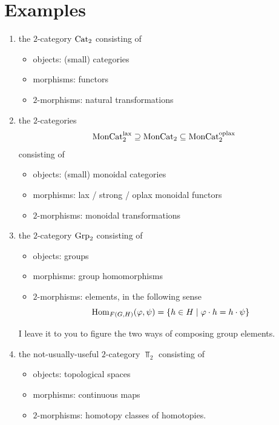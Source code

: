     \section{Examples}
        \begin{enumerate}[label=\roman*)]
            \item
                the $2$-category $\operatorname{Cat}_2$ consisting of
                \begin{itemize}
                    \item[] objects: (small) categories
                    \item[] morphisms: functors
                    \item[] $2$-morphisms: natural transformations
                \end{itemize}
            \item 
                the $2$-categories
                \begin{equation*}
                    \operatorname{MonCat}_2^{\operatorname{lax}} \supseteq \operatorname{MonCat}_2 \subseteq \operatorname{MonCat}_2^{\operatorname{oplax}}
                \end{equation*}
                consisting of
                \begin{itemize}
                    \item[] objects: (small) monoidal categories
                    \item[] morphisms: lax / strong / oplax monoidal functors
                    \item[] $2$-morphisms: monoidal transformations
                \end{itemize}
            \item 
                the $2$-category $\operatorname{Grp}_2$ consisting of
                \begin{itemize}
                    \item[] objects: groups
                    \item[] morphisms: group homomorphisms
                    \item[] $2$-morphisms: elements, in the following sense
                        \begin{equation*}
                            \operatorname{Hom}_{F(G, H)}(\varphi, \psi) = \left\{ h \in H \mid \varphi \cdot h = h \cdot \psi \right\}
                        \end{equation*}
                \end{itemize}
                I leave it to you to figure the two ways of composing group elements.
            \item 
                the not-usually-useful $2$-category $\Top_2$ consisting of
                \begin{itemize}
                    \item[] objects: topological spaces
                    \item[] morphisms: continuous maps
                    \item[] $2$-morphisms: homotopy classes of homotopies.
                \end{itemize}
        \end{enumerate}
